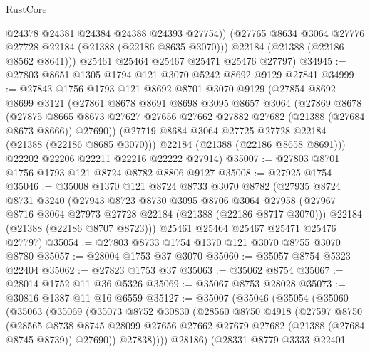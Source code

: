 \begin{lexlean}{RustCore}
\begin{coremodule}
            @24378
            @24381
            @24384
            @24388
            @24393
            @27754))
        (@27765 @8634 @3064 @27776 @27728 @22184 (@21388 (@22186 @8635 @3070)))
        @22184
        (@21388 (@22186 @8562 @8641)))
      @25461
      @25464
      @25467
      @25471
      @25476
      @27797)
@34945 := @27803 @8651 @1305 @1794 @121 @3070 @5242 @8692 @9129 @27841
@34999 := @27843
    @1756
    @1793
    @121
    @8692
    @8701
    @3070
    @9129
    (@27854
      @8692
      @8699
      @3121
      (@27861
        @8678
        @8691
        @8698
        @3095
        @8657
        @3064
        (@27869
          @8678
          (@27875
            @8665
            @8673
            @27627
            @27656
            @27662
            @27882
            @27682
            (@21388 (@27684 @8673 @8666))
            @27690))
        (@27719 @8684 @3064 @27725 @27728 @22184 (@21388 (@22186 @8685 @3070)))
        @22184
        (@21388 (@22186 @8658 @8691)))
      @22202
      @22206
      @22211
      @22216
      @22222
      @27914)
@35007 := @27803 @8701 @1756 @1793 @121 @8724 @8782 @8806 @9127
@35008 := @27925 @1754
@35046 := @35008
    @1370
    @121
    @8724
    @8733
    @3070
    @8782
    (@27935
      @8724
      @8731
      @3240
      (@27943
        @8723
        @8730
        @3095
        @8706
        @3064
        @27958
        (@27967 @8716 @3064 @27973 @27728 @22184 (@21388 (@22186 @8717 @3070)))
        @22184
        (@21388 (@22186 @8707 @8723)))
      @25461
      @25464
      @25467
      @25471
      @25476
      @27797)
@35054 := @27803 @8733 @1754 @1370 @121 @3070 @8755 @3070 @8780
@35057 := @28004 @1753 @37 @3070
@35060 := @35057 @8754 @5323 @22404
@35062 := @27823 @1753 @37
@35063 := @35062 @8754
@35067 := @28014 @1752 @11 @36 @5326
@35069 := @35067 @8753 @28028
@35073 := @30816 @1387 @11 @16 @6559
@35127 := @35007
    (@35046
      (@35054
        (@35060
          (@35063
            (@35069
              (@35073
                @8752
                @30830
                (@28560
                  @8750
                  @4918
                  (@27597
                    @8750
                    (@28565
                      @8738
                      @8745
                      @28099
                      @27656
                      @27662
                      @27679
                      @27682
                      (@21388 (@27684 @8745 @8739))
                      @27690))
                  @27838))))
          @28186)
        (@28331
          @8779
          @3333
          @22401

\end{coremodule}
\end{lexlean}
